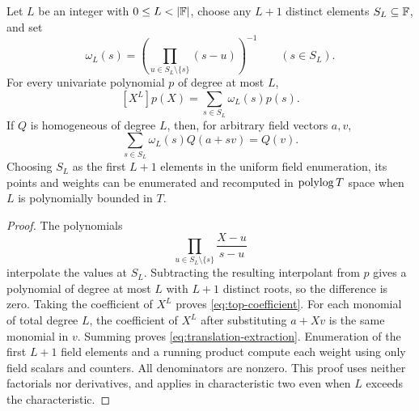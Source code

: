 \begin{lemma}\label{lem:top-coefficient}
Let $L$ be an integer with $0\le L<|\F|$, choose any $L+1$ distinct
elements $S_L\subseteq\mathbb F$, and set
\[
 \omega_L(s)=\left(\prod_{u\in S_L\setminus\{s\}}(s-u)\right)^{-1}
 \qquad(s\in S_L).
\]
For every univariate polynomial $p$ of degree at most $L$,
\begin{equation}\label{eq:top-coefficient}
 [X^L]p(X)=\sum_{s\in S_L}\omega_L(s)p(s).
\end{equation}
If $Q$ is homogeneous of degree $L$, then, for arbitrary field vectors $a,v$,
\begin{equation}\label{eq:translation-extraction}
 \sum_{s\in S_L}\omega_L(s)Q(a+sv)=Q(v).
\end{equation}
Choosing $S_L$ as the first $L+1$ elements in the uniform field enumeration,
its points and weights can be enumerated and recomputed in $\operatorname{polylog} T$
space when $L$ is polynomially bounded in $T$.
\end{lemma}
\begin{proof}
The polynomials
\[
 \prod_{u\in S_L\setminus\{s\}}\frac{X-u}{s-u}
\]
interpolate the values at $S_L$.  Subtracting the resulting interpolant from
$p$ gives a polynomial of degree at most $L$ with $L+1$ distinct roots, so
the difference is zero.  Taking the coefficient of $X^L$ proves
\eqref{eq:top-coefficient}.  For each monomial of total degree $L$, the
coefficient of $X^L$ after substituting $a+Xv$ is the same monomial in $v$.
Summing proves \eqref{eq:translation-extraction}.  Enumeration of the first
$L+1$ field elements and a running product compute each weight using only
field scalars and counters.  All denominators are nonzero.  This proof uses
neither factorials nor derivatives, and applies in characteristic two even
when $L$ exceeds the characteristic.
\end{proof}

